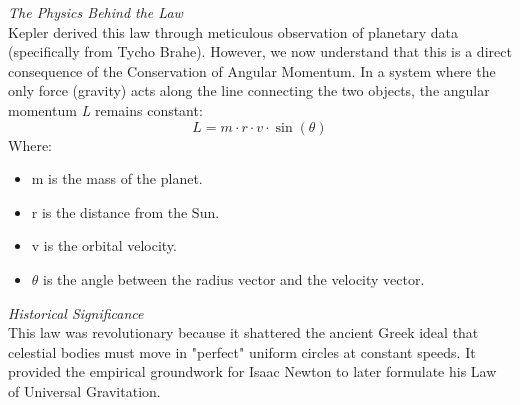 \documentclass[a4paper,10pt]{article}
\begin{document}
\emph{The Physics Behind the Law}\\
Kepler derived this law through meticulous observation of planetary data (specifically from Tycho Brahe). However, we now understand that this is a direct consequence of the Conservation of Angular Momentum.
In a system where the only force (gravity) acts along the line connecting the two objects, the angular momentum \emph{L}
remains constant:
\[
 L = m \cdot r \cdot v \cdot \sin(\theta)
\]
Where:
\begin{itemize}
\item  m  is the mass of the planet.
\item  r  is the distance from the Sun.
\item  v  is the orbital velocity.
 \item \(\theta\)  is the angle between the radius vector and the velocity vector.
\end{itemize}
\emph{Historical Significance}\\
This law was revolutionary because it shattered the ancient Greek ideal that celestial bodies must move in "perfect" uniform circles at constant speeds. It provided the empirical groundwork for Isaac Newton to later formulate his Law of Universal Gravitation.
\end{document}
